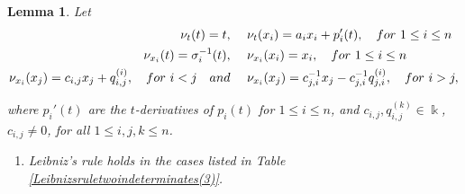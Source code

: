 \documentclass{amsart}
\newtheorem{lemma}[theorem]{Lemma}
\theoremstyle{definition}
\theoremstyle{remark}
\numberwithin{equation}{section}
\begin{document}
\begin{lemma}\label{autoSkewPBWdimn} 
Let
\begin{align}
   \nu_t(t) = t,\quad &\ \nu_t(x_i) = a_ix_i + p_i'(t), \quad {\rm for}\ 1 \leq i \leq n \label{Autoskewn1} \\ \nu_{x_i}(t) = \sigma_{i}^{-1}(t),\quad &\ \nu_{x_i}(x_i) = x_i, \quad {\rm for}\ 1 \leq i \leq n \label{Autoskewn2} \\ 
   \nu_{x_i}(x_j) = c_{i,j}x_j+q_{i,j}^{(i)}, \quad {\rm for}\ i < j \quad {\rm and} \quad &\ \nu_{x_i}(x_j) = c_{j,i}^{-1}x_j-c_{j,i}^{-1}q_{j,i}^{(i)},  \quad {\rm for}\ i > j, \label{Autoskewn3}
\end{align}

where $p_i'(t)$ are the $t$-derivatives of $p_i(t)$ for $1 \leq i \leq n$, and $c_{i,j}, q_{i,j}^{(k)} \in \Bbbk$, $c_{i,j}\not =0$, for all $1\leq i,j,k \leq n$.
\begin{enumerate}
\item [\rm (1)] Leibniz's rule holds in the cases listed in Table \ref{Leibnizsruletwoindeterminates(3)}.
\begin{table}[h]
\caption{Leibniz's rule}
\label{Leibnizsruletwoindeterminates(3)}
\begin{center}
\end{center}
\end{table}
\end{enumerate}
\end{lemma}
\end{document}
